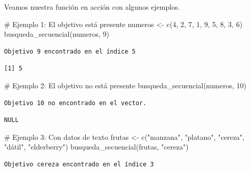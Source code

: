 \documentclass[
  spanish,
  letterpaper,
  DIV=11,
  numbers=noendperiod]{scrreprt}
\newenvironment{Shaded}{\begin{snugshade}}{\end{snugshade}}
\newcommand{\CommentTok}[1]{\textcolor[rgb]{0.37,0.37,0.37}{#1}}
\newcommand{\DecValTok}[1]{\textcolor[rgb]{0.68,0.00,0.00}{#1}}
\newcommand{\FunctionTok}[1]{\textcolor[rgb]{0.28,0.35,0.67}{#1}}
\newcommand{\NormalTok}[1]{\textcolor[rgb]{0.00,0.23,0.31}{#1}}
\newcommand{\OtherTok}[1]{\textcolor[rgb]{0.00,0.23,0.31}{#1}}
\newcommand{\StringTok}[1]{\textcolor[rgb]{0.13,0.47,0.30}{#1}}
\begin{document}
Veamos nuestra función en acción con algunos ejemplos.

\begin{Shaded}
\begin{Highlighting}[]
\CommentTok{\# Ejemplo 1: El objetivo está presente}
\NormalTok{numeros }\OtherTok{\textless{}{-}} \FunctionTok{c}\NormalTok{(}\DecValTok{4}\NormalTok{, }\DecValTok{2}\NormalTok{, }\DecValTok{7}\NormalTok{, }\DecValTok{1}\NormalTok{, }\DecValTok{9}\NormalTok{, }\DecValTok{5}\NormalTok{, }\DecValTok{8}\NormalTok{, }\DecValTok{3}\NormalTok{, }\DecValTok{6}\NormalTok{)}
\FunctionTok{busqueda\_secuencial}\NormalTok{(numeros, }\DecValTok{9}\NormalTok{)}
\end{Highlighting}
\end{Shaded}

\begin{verbatim}
Objetivo 9 encontrado en el índice 5
\end{verbatim}

\begin{verbatim}
[1] 5
\end{verbatim}

\begin{Shaded}
\begin{Highlighting}[]
\CommentTok{\# Ejemplo 2: El objetivo no está presente}
\FunctionTok{busqueda\_secuencial}\NormalTok{(numeros, }\DecValTok{10}\NormalTok{)}
\end{Highlighting}
\end{Shaded}

\begin{verbatim}
Objetivo 10 no encontrado en el vector.
\end{verbatim}

\begin{verbatim}
NULL
\end{verbatim}

\begin{Shaded}
\begin{Highlighting}[]
\CommentTok{\# Ejemplo 3: Con datos de texto}
\NormalTok{frutas }\OtherTok{\textless{}{-}} \FunctionTok{c}\NormalTok{(}\StringTok{"manzana"}\NormalTok{, }\StringTok{"platano"}\NormalTok{, }\StringTok{"cereza"}\NormalTok{, }\StringTok{"dátil"}\NormalTok{, }\StringTok{"elderberry"}\NormalTok{)}
\FunctionTok{busqueda\_secuencial}\NormalTok{(frutas, }\StringTok{"cereza"}\NormalTok{)}
\end{Highlighting}
\end{Shaded}

\begin{verbatim}
Objetivo cereza encontrado en el índice 3
\end{verbatim}
\end{document}
